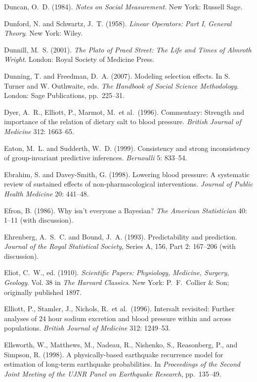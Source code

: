 \smallskip\noindent
Duncan, O.~D. (1984).
{\it Notes on Social Measurement\/}.
New York: Russell Sage.

\smallskip\noindent
Dunford, N. and Schwartz, J.~T. (1958).
{\it Linear Operators: Part I\/}, {\it General Theory\/}.
New York: Wiley.

\smallskip\noindent
Dunnill, M.~S. (2001).
{\it The Plato of Praed Street: The Life and Times of Almroth Wright\/}.
London: Royal Society of Medicine Press.

\smallskip\noindent
Dunning, T. and Freedman, D.~A. (2007).
Modeling selection effects.
In S. Turner and W. Outhwaite, eds.
{\it The Handbook of Social Science Methodology\/}.
London: Sage Publications, pp.~225--31.

\smallskip\noindent
Dyer, A.~R., Elliott, P., Marmot, M.~et al.~(1996).
Commentary: Strength and importance of the relation of dietary salt to blood pressure.
{\it British Journal of Medicine\/} 312: 1663--65.

\smallskip\noindent
Eaton, M.~L. and Sudderth, W.~D. (1999).
Consistency and strong inconsistency of group-invariant predictive inferences.
{\it Bernoulli\/} 5: 833--54.

\smallskip\noindent
Ebrahim, S. and Davey-Smith, G. (1998).
Lowering blood pressure: A systematic review of sustained effects of non-pharmacological interventions.
{\it Journal of Public Health Medicine\/} 20: 441--48.

\smallskip\noindent
Efron, B. (1986).
Why isn't everyone a Bayesian?
{\it The American Statistician\/} 40: 1--11 (with discussion).

\smallskip\noindent
Ehrenberg, A.~S.~C. and Bound, J.~A. (1993).
Predictability and prediction.
{\it Journal of the Royal Statistical Society\/}, Series A, 156, Part 2: 167--206 (with discussion).

\smallskip\noindent
Eliot, C.~W., ed. (1910).
{\it Scientific Papers: Physiology, Medicine, Surgery, Geology\/}.
Vol. 38 in {\it The Harvard Classics\/}.
New York: P.~F.~Collier \& Son; originally published 1897.

\smallskip\noindent
Elliott, P., Stamler, J., Nichols, R.~et al.~(1996).
Intersalt revisited:
Further analyses of 24 hour sodium excretion and blood pressure within and across populations.
{\it British Journal of Medicine\/} 312: 1249--53.

\smallskip\noindent
Ellsworth, W., Matthews, M., Nadeau, R., Nishenko, S., Reasonberg, P., and Simpson, R. (1998).
A physically-based earthquake recurrence model for estimation of long-term earthquake probabilities.
In {\it Proceedings of the Second Joint Meeting of the UJNR Panel on Earthquake Research\/}, pp.~135--49.

